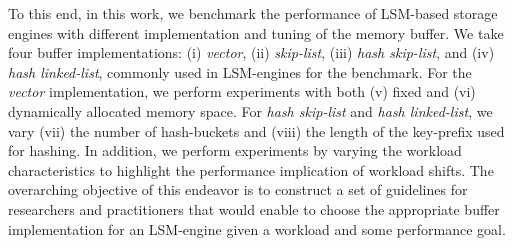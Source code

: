 



To this end, in this work, we benchmark the performance of LSM-based storage engines with different implementation and tuning of the memory buffer. 
We take four buffer implementations: (i) \textit{vector}, (ii) \textit{skip-list}, (iii) \textit{hash skip-list}, and (iv) \textit{hash linked-list}, commonly used in LSM-engines for the benchmark.
For the \textit{vector} implementation, we perform experiments with both (v) fixed and (vi) dynamically allocated memory space. 
For \textit{hash skip-list} and \textit{hash linked-list}, we vary (vii) the number of hash-buckets and (viii) the length of the key-prefix used for hashing.
In addition, we perform experiments by varying the workload characteristics to highlight the performance implication of workload shifts. 
The overarching objective of this endeavor is to construct a set of guidelines for researchers and practitioners that would enable to choose the appropriate buffer implementation for an LSM-engine given a workload and some performance goal. 

